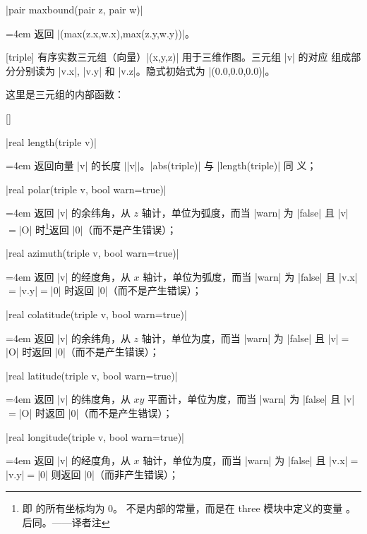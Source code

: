 \documentclass[nofonts,CJKnormalspaces]{ctexbook}[2009/05/20]
\makeatletter
\newenvironment{funclist}{\trivlist
  \parindent=0pt
\item[]
  \def\item{\medskip\par\leftskip=0pt}
  \def\go{\par\leftskip=4em}}
{\endtrivlist}
\newenvironment{typelist}{\itemize
  \let\old@item\@item
  \def\@item[##1]{\expandafter\old@item[\ttfamily\color{type!50!black}##1]}}
{\enditemize}
\newcommand*\prgname[1]{\textsf{#1}}
\newcommand\transnote[1]{\footnote{#1——译者注}}
\makeatother
\begin{document}
\begin{typelist}
\begin{funclist}
\item |pair maxbound(pair z, pair w)| \go
  返回 |(max(z.x,w.x),max(z.y,w.y))|。
\end{funclist}

\item[triple] 有序实数三元组（向量）|(x,y,z)| 用于三维作图。三元组 |v| 的对应
组成部分分别读为 |v.x|, |v.y| 和 |v.z|。隐式初始式为 |(0.0,0.0,0.0)|。

这里是三元组的内部函数：
\begin{funclist}
\item |real length(triple v)| \go
  返回向量 |v| 的长度 $\vert$|v|$\vert$。|abs(triple)| 与 |length(triple)| 同
  义；

\item |real polar(triple v, bool warn=true)| \go
  返回 |v| 的余纬角，从 $z$ 轴计，单位为弧度，而当 |warn| 为 |false| 且
  |v|${}={}$|O| 时\transnote{即  的所有坐标均为 0。
   不是内部的常量，而是在 \prgname{three} 模块中定义的变量
  \inlinecode{(0,0,0)}。后同。}返回 |0|（而不是产生错误）；

\item |real azimuth(triple v, bool warn=true)| \go
  返回 |v| 的经度角，从 $x$ 轴计，单位为弧度，而当 |warn| 为 |false| 且
  |v.x|${}={}$|v.y|${}={}$|0| 时返回 |0|（而不是产生错误）；

\item |real colatitude(triple v, bool warn=true)| \go
  返回 |v| 的余纬角，从 $z$ 轴计，单位为度，而当 |warn| 为 |false| 且
  |v|${}={}$|O| 时返回 |0|（而不是产生错误）；

\item |real latitude(triple v, bool warn=true)| \go
  返回 |v| 的纬度角，从 $xy$ 平面计，单位为度，而当 |warn| 为 |false| 且
  |v|${}={}$|O| 时返回 |0|（而不是产生错误）；

\item |real longitude(triple v, bool warn=true)| \go
  返回 |v| 的经度角，从 $x$ 轴计，单位为度，而当 |warn| 为 |false| 且
  |v.x|${}={}$|v.y|${}={}$|0| 则返回 |0|（而非产生错误）；


\end{funclist}
\end{typelist}
\end{document}
